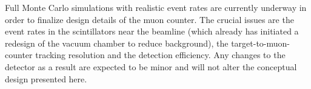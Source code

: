 Full Monte Carlo simulations with realistic event rates are currently underway in order to finalize design details of the muon counter.  The crucial issues are the event rates in the scintillators near the beamline (which already has initiated a redesign of the vacuum chamber to reduce background), the target-to-muon-counter tracking resolution and the detection efficiency.  Any changes to the detector as a result are expected to be minor and will not alter the conceptual design presented here.

